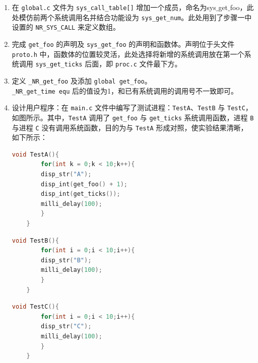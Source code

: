 \begin{enumerate}
\begin{enumerate}
            \item 在 \texttt{global.c} 文件为 \texttt{sys\_call\_table[]} 增加一个成员，命名为sys$\_$get$\_$foo，此处模仿前两个系统调用名并结合功能设为 \texttt{sys\_get\_num}。此处用到了步骤一中设置的 \texttt{NR\_SYS\_CALL} 来定义数组。
            
            \item 完成 \texttt{get\_foo} 的声明及 \texttt{sys\_get\_foo} 的声明和函数体。声明位于头文件 \texttt{proto.h} 中，函数体的位置较灵活，此处选择将新增的系统调用放在第一个系统调用 \texttt{sys\_get\_ticks} 后面，即 \texttt{proc.c} 文件最下方。
            
            \item 定义 \texttt{\_NR\_get\_foo} 及添加 \texttt{global get\_foo}。\\\texttt{\_NR\_get\_time equ} 后的值设为1，和已有系统调用的调用号不一致即可。
            
            \item 设计用户程序：在 \texttt{main.c} 文件中编写了测试进程：\texttt{TestA}、\texttt{TestB} 与 \texttt{TestC}，如图所示。其中，\texttt{TestA} 调用了 \texttt{get\_foo} 与 \texttt{get\_ticks} 系统调用函数，进程 \texttt{B} 与进程 \texttt{C} 没有调用系统函数，目的为与 \texttt{TestA} 形成对照，使实验结果清晰，如下所示：
            \begin{lstlisting}[language = C]
    void TestA(){
        for(int k = 0;k < 10;k++){
        disp_str("A");
        disp_int(get_foo() + 1);
        disp_int(get_ticks());
        milli_delay(100);
        }
    }
            \end{lstlisting}
            \begin{lstlisting}[language = C]
    void TestB(){
        for(int i = 0;i < 10;i++){
        disp_str("B");
        milli_delay(100);
        }
    }
            \end{lstlisting}
            \begin{lstlisting}[language = C]
    void TestC(){
        for(int i = 0;i < 10;i++){
        disp_str("C");
        milli_delay(100);
        }
    }
            \end{lstlisting}
        \end{enumerate}
    \end{enumerate}


